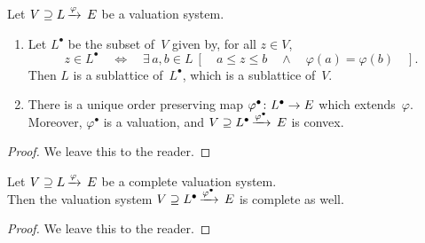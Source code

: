 \documentclass[main.tex]{subfiles}
\begin{document}
%
\begin{prop}
\label{P:convex-completion}
Let $V \supseteq L\,\smash{\xrightarrow{\varphi}\,E}$ be a valuation system.
\begin{enumerate}
\item
Let $L^\bullet$ be the subset of~$V$ given by,
for all $z\in V$,
\begin{equation*}
z\in L^\bullet \quad\iff\quad
\exists\, a,b\in L\ [
\quad a\leq z\leq b \quad\wedge\quad \varphi(a) = \varphi(b)\quad].
\end{equation*}
Then $L$ is a sublattice of~$L^\bullet$, which is a sublattice of~$V$.

\item
There is a unique order preserving map $\varphi^\bullet\colon L^\bullet\rightarrow E$
which extends~$\varphi$.\\
Moreover, $\varphi^\bullet$
is a valuation,
and  $V \supseteq L^\bullet\,\smash{\xrightarrow{\varphi^\bullet}\,E}$ is convex.
\end{enumerate}
\end{prop}
\begin{proof}
We leave this to the reader.
\end{proof}
%
%
%
\begin{prop}
\label{P:convexification_versus_completion}
Let $V \supseteq L\,\smash{\xrightarrow{\varphi}\,E}$ be a complete valuation system.\\
Then 
the valuation system 
$V \supseteq L^\bullet\,\smash{\xrightarrow{\varphi^\bullet}\,E}$ is complete as well.
\end{prop}
\begin{proof}
We leave this to the reader.
\end{proof}
\end{document}
